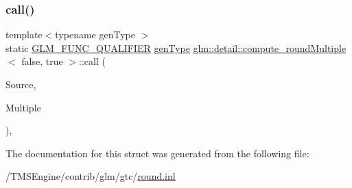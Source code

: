 \subsubsection{\texorpdfstring{call()}{call()}}
{\footnotesize\ttfamily template$<$typename gen\+Type $>$ \\
static \hyperlink{setup_8hpp_a33fdea6f91c5f834105f7415e2a64407}{G\+L\+M\+\_\+\+F\+U\+N\+C\+\_\+\+Q\+U\+A\+L\+I\+F\+I\+ER} \hyperlink{structglm_1_1detail_1_1gen_type}{gen\+Type} \hyperlink{structglm_1_1detail_1_1compute__round_multiple}{glm\+::detail\+::compute\+\_\+round\+Multiple}$<$ false, true $>$\+::call (\begin{DoxyParamCaption}\item[{\hyperlink{structglm_1_1detail_1_1gen_type}{gen\+Type}}]{Source,  }\item[{\hyperlink{structglm_1_1detail_1_1gen_type}{gen\+Type}}]{Multiple }\end{DoxyParamCaption})\hspace{0.3cm}{\ttfamily [inline]}, {\ttfamily [static]}}



The documentation for this struct was generated from the following file\+:\begin{DoxyCompactItemize}
\item 
/\+T\+M\+S\+Engine/contrib/glm/gtc/\hyperlink{round_8inl}{round.\+inl}\end{DoxyCompactItemize}
